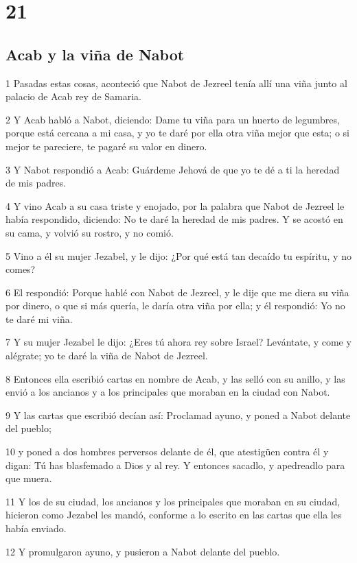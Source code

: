 \chapter{21}

\section*{Acab y la viña de Nabot}

\par 1 Pasadas estas cosas, aconteció que Nabot de Jezreel tenía allí una viña junto al palacio de Acab rey de Samaria.
\par 2 Y Acab habló a Nabot, diciendo: Dame tu viña para un huerto de legumbres, porque está cercana a mi casa, y yo te daré por ella otra viña mejor que esta; o si mejor te pareciere, te pagaré su valor en dinero.
\par 3 Y Nabot respondió a Acab: Guárdeme Jehová de que yo te dé a ti la heredad de mis padres.
\par 4 Y vino Acab a su casa triste y enojado, por la palabra que Nabot de Jezreel le había respondido, diciendo: No te daré la heredad de mis padres. Y se acostó en su cama, y volvió su rostro, y no comió.
\par 5 Vino a él su mujer Jezabel, y le dijo: ¿Por qué está tan decaído tu espíritu, y no comes?
\par 6 El respondió: Porque hablé con Nabot de Jezreel, y le dije que me diera su viña por dinero, o que si más quería, le daría otra viña por ella; y él respondió: Yo no te daré mi viña.
\par 7 Y su mujer Jezabel le dijo: ¿Eres tú ahora rey sobre Israel? Levántate, y come y alégrate; yo te daré la viña de Nabot de Jezreel.
\par 8 Entonces ella escribió cartas en nombre de Acab, y las selló con su anillo, y las envió a los ancianos y a los principales que moraban en la ciudad con Nabot.
\par 9 Y las cartas que escribió decían así: Proclamad ayuno, y poned a Nabot delante del pueblo;
\par 10 y poned a dos hombres perversos delante de él, que atestigüen contra él y digan: Tú has blasfemado a Dios y al rey. Y entonces sacadlo, y apedreadlo para que muera.
\par 11 Y los de su ciudad, los ancianos y los principales que moraban en su ciudad, hicieron como Jezabel les mandó, conforme a lo escrito en las cartas que ella les había enviado.
\par 12 Y promulgaron ayuno, y pusieron a Nabot delante del pueblo.
